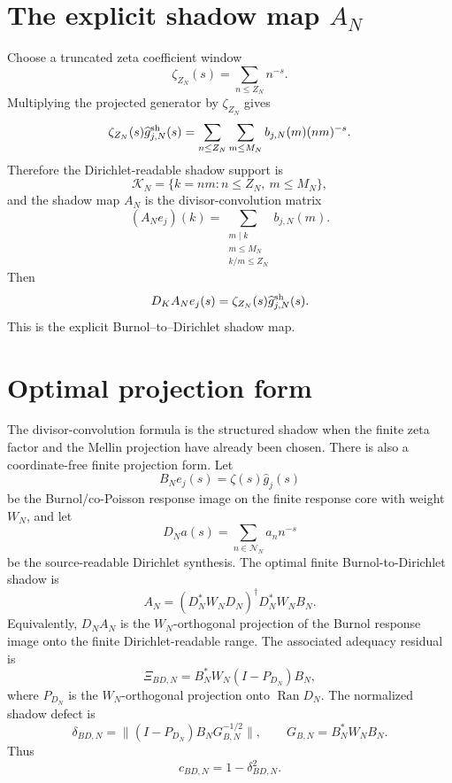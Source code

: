 \documentclass[11pt]{article}
\begin{document}
\section{The explicit shadow map $A_N$}
Choose a truncated zeta coefficient window
\[
  \zeta_{Z_N}(s)=\sum_{n\le Z_N}n^{-s}.
\]
Multiplying the projected generator by $\zeta_{Z_N}$ gives
\[
  \zeta_{Z_N}(s)\widehat g^{\rm sh}_{j,N}(s)
  =\sum_{n\le Z_N}\sum_{m\le M_N}b_{j,N}(m)(nm)^{-s}.
\]
Therefore the Dirichlet-readable shadow support is
\[
  \mathcal K_N=\{k=nm:n\le Z_N,\ m\le M_N\},
\]
and the shadow map $A_N$ is the divisor-convolution matrix
\[
  \boxed{
  (A_Ne_j)(k)=
  \sum_{\substack{m\mid k\\m\le M_N\\ k/m\le Z_N}} b_{j,N}(m).
  }
\]
Then
\[
  D_KA_Ne_j(s)=\zeta_{Z_N}(s)\widehat g^{\rm sh}_{j,N}(s).
\]
This is the explicit Burnol--to--Dirichlet shadow map.


\section{Optimal projection form}
The divisor-convolution formula is the structured shadow when the finite zeta factor and the Mellin projection have already been chosen. There is also a coordinate-free finite projection form. Let
\[
  B_Ne_j(s)=\zeta(s)\widehat g_j(s)
\]
be the Burnol/co-Poisson response image on the finite response core with weight $W_N$, and let
\[
  D_Na(s)=\sum_{n\in\mathcal N_N}a_n n^{-s}
\]
be the source-readable Dirichlet synthesis. The optimal finite Burnol-to-Dirichlet shadow is
\[
  \boxed{A_N=(D_N^*W_ND_N)^{\dagger}D_N^*W_NB_N.}
\]
Equivalently, $D_NA_N$ is the $W_N$-orthogonal projection of the Burnol response image onto the finite Dirichlet-readable range.
The associated adequacy residual is
\[
  \boxed{\Xi_{BD,N}=B_N^*W_N(I-P_{D_N})B_N,}
\]
where $P_{D_N}$ is the $W_N$-orthogonal projection onto $\operatorname{Ran}D_N$.
The normalized shadow defect is
\[
  \boxed{\delta_{BD,N}=\|(I-P_{D_N})B_NG_{B,N}^{-1/2}\|,\qquad
  G_{B,N}=B_N^*W_NB_N.}
\]
Thus
\[
  c_{BD,N}=1-\delta_{BD,N}^2.
\]
\end{document}
